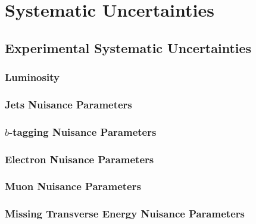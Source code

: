 \documentclass[10pt,twoside,cucitura,classica,english,openany]{toptesi}
\begin{document}


\section{Systematic Uncertainties}
\label{sec:syst-uncert-1}



\subsection{Experimental Systematic Uncertainties}
\label{sec:exper-syst-uncert}



\subsubsection{Luminosity}
\label{sec:luminosity}



\subsubsection{Jets Nuisance Parameters}
\label{sec:jets-nuis-param}



\subsubsection{$b$-tagging Nuisance Parameters}
\label{sec:b-tagging-nuisance}



\subsubsection{Electron Nuisance Parameters}
\label{sec:electr-nuis-param}



\subsubsection{Muon Nuisance Parameters}
\label{sec:muon-nuis-param}



\subsubsection{Missing Transverse Energy Nuisance Parameters}
\label{sec:met-np}
\end{document}
